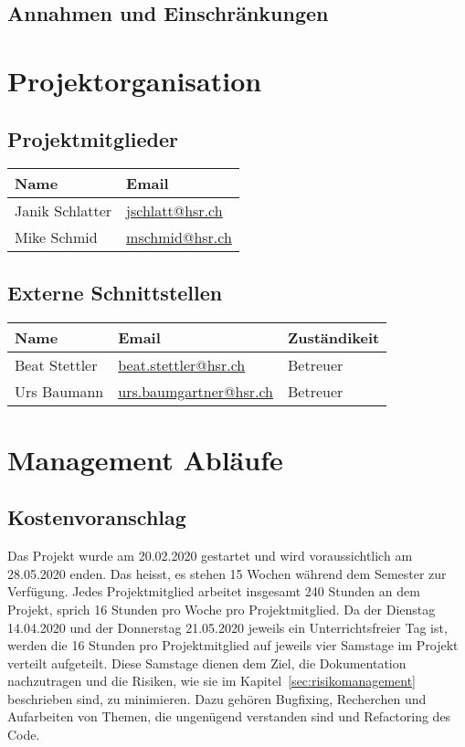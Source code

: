 \documentclass[
	ngerman,
	toc=listof, %
	toc=bibliography, %
	footnotes=multiple, %
	parskip=half, %
	numbers=noendperiod %
]{scrartcl}
\begin{document}
	\subsection{Annahmen und Einschränkungen}

\section{Projektorganisation}

	\subsection{Projektmitglieder}
		\begin{tabularx}{0.9\textwidth}{lX}
			\toprule
			Name & Email \\
			\midrule
			Janik Schlatter & \url{jschlatt@hsr.ch} \\
			Mike Schmid & \url{mschmid@hsr.ch} \\
			\bottomrule
		\end{tabularx}

	\subsection{Externe Schnittstellen}
		\begin{tabularx}{0.9\textwidth}{lXl}
			\toprule
			Name & Email & Zuständikeit \\
			\midrule
			Beat Stettler & \url{beat.stettler@hsr.ch} & Betreuer \\
			Urs Baumann & \url{urs.baumgartner@hsr.ch} & Betreuer \\
			\bottomrule
		\end{tabularx}

\section{Management Abläufe}

	\subsection{Kostenvoranschlag}
		Das Projekt wurde am 20.02.2020 gestartet und wird voraussichtlich am 28.05.2020 enden.
		Das heisst, es stehen 15 Wochen während dem Semester zur Verfügung. 
		Jedes Projektmitglied arbeitet insgesamt 240 Stunden an dem Projekt, sprich 16 Stunden pro Woche pro Projektmitglied.
		Da der Dienstag 14.04.2020 und der Donnerstag 21.05.2020 jeweils ein Unterrichtsfreier Tag ist, werden die 16 Stunden pro Projektmitglied auf jeweils vier Samstage im Projekt verteilt aufgeteilt.
		Diese Samstage dienen dem Ziel, die Dokumentation nachzutragen und die Risiken, wie sie im Kapitel~\ref{sec:risikomanagement} beschrieben sind, zu minimieren. 
		Dazu gehören Bugfixing, Recherchen und Aufarbeiten von Themen, die ungenügend verstanden sind und Refactoring des Code.
\end{document}
